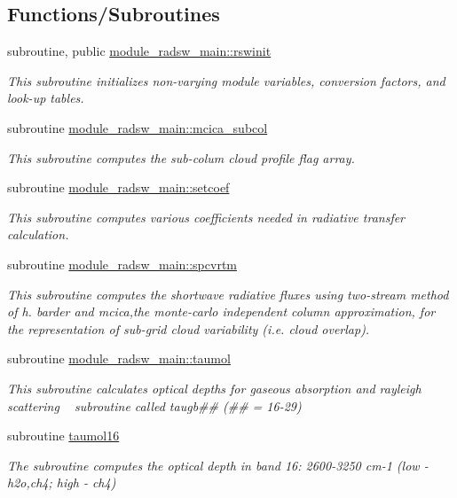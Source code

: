 \subsection*{Functions/\+Subroutines}
\begin{DoxyCompactItemize}
\item 
subroutine, public \hyperlink{group__module__radsw__main_ga9288a5da63d182f20c99e0044ca52f29}{module\+\_\+radsw\+\_\+main\+::rswinit}
\begin{DoxyCompactList}\small\item\em This subroutine initializes non-\/varying module variables, conversion factors, and look-\/up tables. \end{DoxyCompactList}\item 
subroutine \hyperlink{group__module__radsw__main_gae5916f7b0f63f7836a8ab80ce3933482}{module\+\_\+radsw\+\_\+main\+::mcica\+\_\+subcol}
\begin{DoxyCompactList}\small\item\em This subroutine computes the sub-\/colum cloud profile flag array. \end{DoxyCompactList}\item 
subroutine \hyperlink{group__module__radsw__main_gaaa580fe228ccc04abd54368c8df0f312}{module\+\_\+radsw\+\_\+main\+::setcoef}
\begin{DoxyCompactList}\small\item\em This subroutine computes various coefficients needed in radiative transfer calculation. \end{DoxyCompactList}\item 
subroutine \hyperlink{group__module__radsw__main_gae30ee993080f035f0e05cda7c7baffce}{module\+\_\+radsw\+\_\+main\+::spcvrtm}
\begin{DoxyCompactList}\small\item\em This subroutine computes the shortwave radiative fluxes using two-\/stream method of h. barder and mcica,the monte-\/carlo independent column approximation, for the representation of sub-\/grid cloud variability (i.\+e. cloud overlap). \end{DoxyCompactList}\item 
subroutine \hyperlink{group__module__radsw__main_gaafef1e054b5103007f57129c07fcba81}{module\+\_\+radsw\+\_\+main\+::taumol}
\begin{DoxyCompactList}\small\item\em This subroutine calculates optical depths for gaseous absorption and rayleigh scattering ~\newline
 subroutine called taugb\#\# (\#\# = 16-\/29) \end{DoxyCompactList}\item 
subroutine \hyperlink{group__module__radsw__main_ga8702f5f6285ff1a5cbfad740545fffb6}{taumol16}
\begin{DoxyCompactList}\small\item\em The subroutine computes the optical depth in band 16\+: 2600-\/3250 cm-\/1 (low -\/ h2o,ch4; high -\/ ch4) \end{DoxyCompactList}\end{DoxyCompactItemize}
